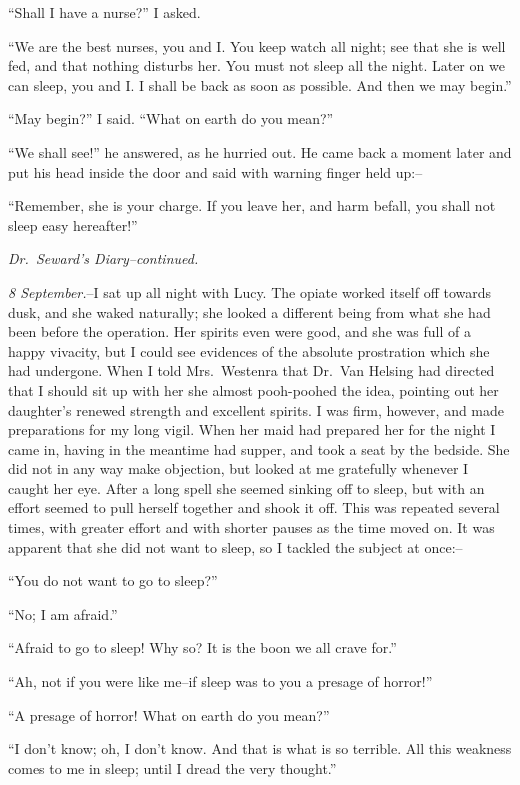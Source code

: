 \documentclass[12pt,openright]{book}
\begin{document}
“Shall I have a nurse?” I asked.

“We are the best nurses, you and I. You keep watch all night; see that she is well fed, and that nothing disturbs her. You must not sleep all the night. Later on we can sleep, you and I. I shall be back as soon as possible. And then we may begin.”

“May begin?” I said. “What on earth do you mean?”

“We shall see!” he answered, as he hurried out. He came back a moment later and put his head inside the door and said with warning finger held up:–

“Remember, she is your charge. If you leave her, and harm befall, you shall not sleep easy hereafter!”

\textit{Dr. Seward’s Diary–continued.}

\textit{8 September.}–I sat up all night with Lucy. The opiate worked itself off towards dusk, and she waked naturally; she looked a different being from what she had been before the operation. Her spirits even were good, and she was full of a happy vivacity, but I could see evidences of the absolute prostration which she had undergone. When I told Mrs. Westenra that Dr. Van Helsing had directed that I should sit up with her she almost pooh-poohed the idea, pointing out her daughter’s renewed strength and excellent spirits. I was firm, however, and made preparations for my long vigil. When her maid had prepared her for the night I came in, having in the meantime had supper, and took a seat by the bedside. She did not in any way make objection, but looked at me gratefully whenever I caught her eye. After a long spell she seemed sinking off to sleep, but with an effort seemed to pull herself together and shook it off. This was repeated several times, with greater effort and with shorter pauses as the time moved on. It was apparent that she did not want to sleep, so I tackled the subject at once:–

“You do not want to go to sleep?”

“No; I am afraid.”

“Afraid to go to sleep! Why so? It is the boon we all crave for.”

“Ah, not if you were like me–if sleep was to you a presage of horror!”

“A presage of horror! What on earth do you mean?”

“I don’t know; oh, I don’t know. And that is what is so terrible. All this weakness comes to me in sleep; until I dread the very thought.”
\end{document}
